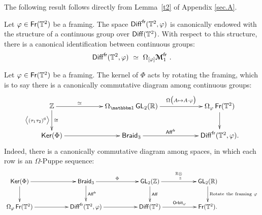 The following result follows directly from Lemma~\ref{t2} of Appendix \ref{sec.A}.
\begin{cor}\label{t3}
Let $\varphi \in \operatorname{\sf Fr}(\mathbb T^2)$ be a framing.
The space $\operatorname{{\sf Diff}}^{\operatorname{\sf fr}}(\mathbb T^2 , \varphi)$ is canonically endowed with the structure of a continuous group over $\operatorname{{\sf Diff}}(\mathbb T^2)$.
With respect to this structure, 
there is a canonical identification between continuous groups:
\[
\operatorname{{\sf Diff}}^{\operatorname{\sf fr}}(\mathbb T^2, \varphi)
~\simeq~
\Omega_{[\varphi]}  \boldsymbol{\mathcal M}_1^{\operatorname{\sf fr}} 
~.
\]


\end{cor}






\begin{observation}
\label{t43}
Let $\varphi \in \operatorname{\sf Fr}(\mathbb T^2)$ be a framing.
The kernel of $\Phi$ acts by rotating the framing, which is to say 
there is a canonically commutative diagram among continuous groups:
\[
\xymatrix{
\ZZ
\ar[d]^-{\cong}_-{\bigl\lag (\tau_1\tau_2)^6 \bigr\rag}
\ar[rr]^-{\simeq}
&&
\Omega_{\uno} \GL_2(\RR)
\ar[rr]^-{\Omega \bigl( A\mapsto A \cdot \varphi \bigr)}
&&
\Omega_{\varphi} \Fr(\TT^2)
\ar[d]
\\
\Ker(\Phi)
\ar[rr]
&&
\Braid
\ar[rr]^-{\Aff^{\fr}}
&&
\Diff^{\fr}(\TT^2, \varphi)
.
}
\]
Indeed, there is a canonically commutative diagram among spaces, in which each row is an $\Omega$-Puppe sequence:
\[
\xymatrix{
\Ker(\Phi)
\ar[rr]
\ar[d]
&&
\Braid
\ar[rr]^-{\Phi}
\ar[d]^-{\Aff^{\fr}}
&&
\GL_2(\ZZ)
\ar[rr]^-{\RR\underset{\ZZ}\ot}
\ar[d]^-{\Aff}
&&
\GL_2(\RR)
\ar[d]^-{\rm Rotate~the~framing~\varphi}
\\
\Omega_{\varphi} \Fr(\TT^2)
\ar[rr]
&&
\Diff^{\fr}(\TT^2,\varphi)
\ar[rr]
&&
\Diff(\TT^2)
\ar[rr]^-{{\sf Orbit}_{\varphi}}
&&
\Fr(\TT^2)
.
}
\]

\end{observation}
































